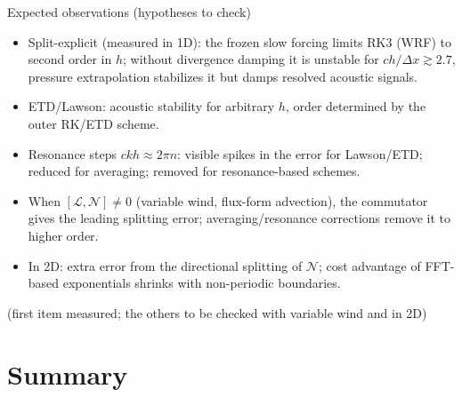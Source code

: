 \documentclass[aspectratio=169,10pt]{beamer}
\newcommand{\LL}{\mathcal{L}}   %
\newcommand{\NN}{\mathcal{N}}   %
\begin{document}
\begin{frame}{Expected observations (hypotheses to check)}
  \begin{itemize}
    \item Split-explicit (measured in 1D): the frozen slow forcing limits RK3 (WRF) to second order in $h$; without divergence damping it is
    unstable for $ch/\Delta x\gtrsim2.7$, pressure extrapolation stabilizes it but damps resolved acoustic signals.
    \item ETD/Lawson: acoustic stability for arbitrary $h$, order determined by the outer RK/ETD scheme.
    \item Resonance steps $ckh\approx 2\pi n$: visible spikes in the error for Lawson/ETD; reduced for averaging;
    removed for resonance-based schemes.
    \item When $[\LL,\NN]\neq0$ (variable wind, flux-form advection), the commutator gives the leading splitting error;
    averaging/resonance corrections remove it to higher order.
    \item In 2D: extra error from the directional splitting of $\NN$; cost advantage of FFT-based exponentials shrinks with non-periodic boundaries.
  \end{itemize}
  \vspace{0.5em}
  {\footnotesize (first item measured; the others to be checked with variable wind and in 2D)}
\end{frame}

\section{Summary}
\end{document}

